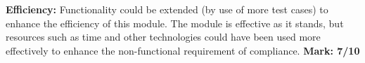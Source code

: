         \item \textbf{Efficiency:}
				Functionality could be extended (by use of more test cases) to enhance
				the efficiency of this module.
				The module is effective as it stands, but resources such as time and
				other technologies could have been used more effectively to enhance the
				non-functional requirement of compliance.
				\newline
				\textbf{Mark: 7/10}